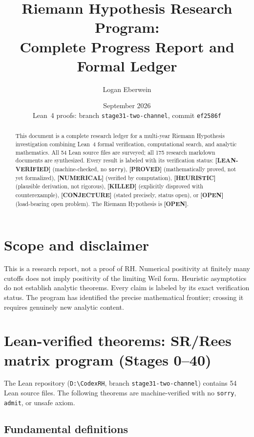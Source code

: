 \documentclass[11pt]{article}
\title{\textbf{Riemann Hypothesis Research Program:\\
Complete Progress Report and Formal Ledger}}
\author{Logan Eberwein}
\date{September 2026 \\ \small Lean~4 proofs: branch \texttt{stage31-two-channel}, commit \texttt{ef2586f}}
\theoremstyle{remark}
\newcommand{\LEANVERIFIED}{\textbf{\color{green!60!black}[LEAN-VERIFIED]}}
\newcommand{\PROVED}{\textbf{\color{blue}[PROVED]}}
\newcommand{\NUMERICAL}{\textbf{\color{orange}[NUMERICAL]}}
\newcommand{\HEURISTIC}{\textbf{\color{orange!80!black}[HEURISTIC]}}
\newcommand{\KILLED}{\textbf{\color{red}[KILLED]}}
\newcommand{\OPEN}{\textbf{\color{purple}[OPEN]}}
\newcommand{\CONJECTURE}{\textbf{\color{violet}[CONJECTURE]}}
\begin{document}
\maketitle

\begin{abstract}
This document is a complete research ledger for a multi-year Riemann Hypothesis investigation
combining Lean~4 formal verification, computational search, and analytic mathematics.
All 54 Lean source files are surveyed; all 175 research markdown documents are synthesized.
Every result is labeled with its verification status:
\LEANVERIFIED{} (machine-checked, no \texttt{sorry}),
\PROVED{} (mathematically proved, not yet formalized),
\NUMERICAL{} (verified by computation),
\HEURISTIC{} (plausible derivation, not rigorous),
\KILLED{} (explicitly disproved with counterexample),
\CONJECTURE{} (stated precisely, status open),
or \OPEN{} (load-bearing open problem).
The Riemann Hypothesis is \OPEN{}.
\end{abstract}

\tableofcontents
\newpage

\section{Scope and disclaimer}

This is a research report, not a proof of RH.
Numerical positivity at finitely many cutoffs does not imply positivity of the limiting Weil form.
Heuristic asymptotics do not establish analytic theorems.
Every claim is labeled by its exact verification status.
The program has identified the precise mathematical frontier; crossing it requires genuinely new analytic content.

\section{Lean-verified theorems: SR/Rees matrix program (Stages 0--40)}

The Lean repository (\texttt{D:\textbackslash{}CodexRH}, branch \texttt{stage31-two-channel})
contains 54 Lean source files. The following theorems are machine-verified with no
\texttt{sorry}, \texttt{admit}, or unsafe axiom.

\subsection{Fundamental definitions}
\end{document}
